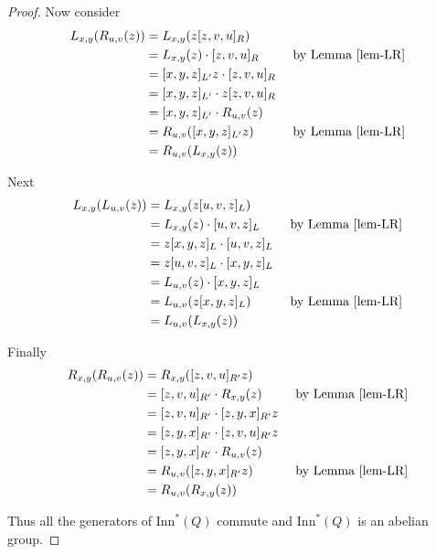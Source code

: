 \documentclass[12pt]{report}
\theoremstyle{definition}
\newcommand{\inn}{\text{Inn}}       %
\begin{document}
\begin{proof}
  Now consider
  \begin{alignat*}{2}
    L_{x, y}(R_{u, v}(z)) &= L_{x, y}(z[z, v, u]_R) &&\\
    &= L_{x, y}(z)\cdot [z, v, u]_R &&\text{ by Lemma \ref{lem-LR}}\\
    &= [x, y, z]_{L'}z\cdot [z, v, u]_R &&\\
    &= [x, y, z]_{L'} \cdot z[z, v, u]_R &&\\
    &= [x, y, z]_{L'}\cdot R_{u, v}(z) &&\\
    &= R_{u, v}([x, y, z]_{L'}z) &&\text{ by Lemma \ref{lem-LR}}\\
    &= R_{u, v}(L_{x, y}(z)) &&
  \end{alignat*}

  Next
  \begin{alignat*}{2}
    L_{x, y}(L_{u, v}(z)) &= L_{x, y}(z[u, v, z]_L) &&\\
    &= L_{x, y}(z)\cdot [u, v, z]_L &&\text{ by Lemma \ref{lem-LR}}\\
    &= z[x, y, z]_L\cdot [u, v, z]_L &&\\
    &= z[u, v, z]_L\cdot [x, y, z]_L &&\\
    &= L_{u, v}(z)\cdot [x, y, z]_L &&\\
    &= L_{u, v}(z[x, y, z]_L) &&\text{ by Lemma \ref{lem-LR}}\\
    &= L_{u, v}(L_{x, y}(z)) &&
  \end{alignat*}

  Finally
  \begin{alignat*}{2}
    R_{x, y}(R_{u, v}(z)) &= R_{x, y}([z, v, u]_{R'}z) &&\\
    &= [z, v, u]_{R'}\cdot R_{x, y}(z) &&\text{ by Lemma \ref{lem-LR}}\\
    &= [z, v, u]_{R'}\cdot [z, y, x]_{R'}z &&\\
    &= [z, y, x]_{R'}\cdot [z, v, u]_{R'}z &&\\
    &= [z, y, x]_{R'}\cdot R_{u, v}(z) &&\\
    &= R_{u, v}([z, y, x]_{R'}z) &&\text{ by Lemma \ref{lem-LR}}\\
    &= R_{u, v}(R_{x, y}(z)) &&
  \end{alignat*}

  Thus all the generators of $\inn^*(Q)$ commute and $\inn^*(Q)$ is an abelian group.
\end{proof}

\end{document}
